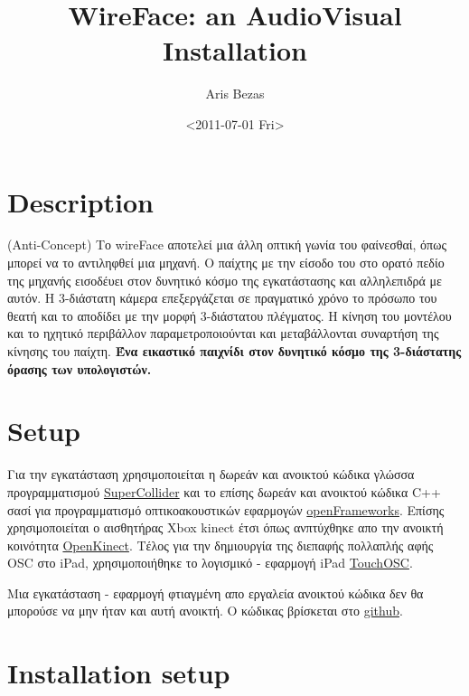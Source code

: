 \documentclass[11pt, a4paper]{scrartcl}
\begin{document}
\title{WireFace: an AudioVisual Installation}
\author{Aris Bezas}
\date{<2011-07-01 Fri>}
\maketitle

\setcounter{tocdepth}{3}
\tableofcontents
\vspace*{1cm}



\section{Description}
\label{sec-1}

(Anti-Concept) 
Το wireFace αποτελεί μια άλλη οπτική γωνία του φαίνεσθαί, όπως μπορεί να το αντιληφθεί 
μια μηχανή. Ο παίχτης με την είσοδο του στο ορατό πεδίο της μηχανής εισοδέυει στον 
δυνητικό κόσμο της εγκατάστασης και αλληλεπιδρά με αυτόν. Η 3-διάστατη κάμερα 
επεξεργάζεται σε πραγματικό χρόνο το πρόσωπο του θεατή και το αποδίδει με την μορφή 
3-διάστατου πλέγματος. Η κίνηση του μοντέλου και το ηχητικό περιβάλλον παραμετροποιούνται 
και μεταβάλλονται συναρτήση της κίνησης του παίχτη. 
\textbf{Ένα εικαστικό παιχνίδι στον δυνητικό κόσμο της 3-διάστατης όρασης των υπολογιστών.}
\section{Setup}
\label{sec-2}

Για την εγκατάσταση χρησιμοποιείται η δωρεάν και ανοικτού κώδικα γλώσσα προγραμματισμού
 \href{http://supercollider.sourceforge.net/}{SuperCollider} και το επίσης δωρεάν και ανοικτού κώδικα C++ σασί για προγραμματισμό οπτικοακουστικών 
εφαρμογών \href{http://www.openframeworks.cc/}{openFrameworks}. Επίσης χρησιμοποιείται ο αισθητήρας Xbox kinect έτσι 
όπως ανπτύχθηκε απο την ανοικτή κοινότητα \href{http://openkinect.org/wiki/Main_Page}{OpenKinect}. Τέλος για την δημιουργία της διεπαφής πολλαπλής αφής OSC
στο iPad, χρησιμοποιήθηκε το λογισμικό - εφαρμογή iPad  \href{http://hexler.net/software/touchosc}{TouchOSC}.

Μια εγκατάσταση - εφαρμογή φτιαγμένη απο εργαλεία ανοικτού κώδικα δεν θα μπορούσε να μην ήταν και αυτή 
ανοικτή. Ο κώδικας βρίσκεται στο \href{https://github.com/igoumeninja/WireFace}{github}.
\section{Installation setup}
\label{sec-3}
\end{document}
